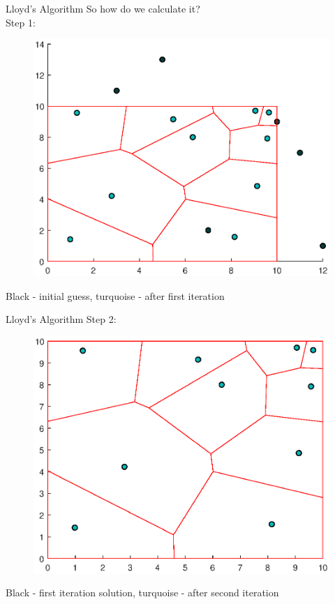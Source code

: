\documentclass[t]{beamer}
\begin{document}
\begin{frame}[label=lloydsalg2]{Lloyd's Algorithm}
So how do we calculate it?\\
Step 1:
\begin{figure}
\centering
\includegraphics[scale=0.4]{background/cvt-calc-step1.eps}
\end{figure}
Black - initial guess, turquoise - after first iteration
\end{frame}
\begin{frame}[label=lloydsalg3]{Lloyd's Algorithm}
Step 2:
\begin{figure}
\centering
\includegraphics[scale=0.4]{background/cvt-calc-step2.eps}
\end{figure}
Black - first iteration solution, turquoise - after second iteration
\end{frame}
\end{document}
